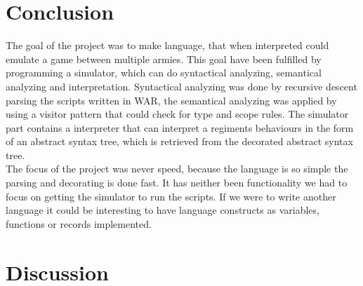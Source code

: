 \section{Conclusion}
	The goal of the project was to make language, that when interpreted could emulate a game between multiple armies. 
	This goal have been fulfilled by programming a simulator, which can do syntactical analyzing, semantical analyzing and interpretation.
	Syntactical analyzing was done by recursive descent parsing the scripts written in WAR, the semantical analyzing was applied by using 
	a visitor pattern that could check for type and scope rules. The simulator part contains a interpreter that can interpret 
	a regiments behaviours in the form of an abstract syntax tree, which is retrieved from the decorated abstract syntax tree. \\
	
	The focus of the project was never speed, because the language is so simple the parsing and decorating is done fast.
	It has neither been functionality we had to focus on getting the simulator to run the scripts. If we were to write another language 
	it could be interesting to have language constructs as variables, functions or records implemented.
	 



\section{Discussion}